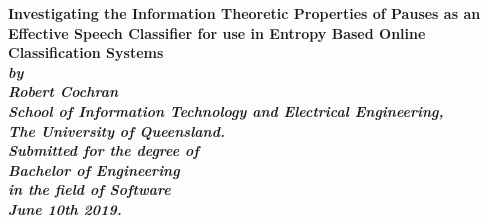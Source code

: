 \begin{titlepage}
\renewcommand{\baselinestretch}{1.0}
\begin{center}
\vspace*{35mm}
\Huge\bf
		Investigating the Information Theoretic 
		Properties of Pauses as an Effective Speech Classifier
		for use in Entropy Based Online Classification Systems \\
\vspace{20mm}
\large\sl
		by\\
		Robert Cochran
		\medskip\\
\rm
		School of Information Technology and Electrical Engineering,\\
		The University of Queensland.\\
\vspace{30mm}
		Submitted for the degree of\\
		Bachelor of Engineering
		\smallskip\\
\normalsize
		in the field of Software
		\medskip\\
\large
		June 10th 2019.		
\end{center}
\end{titlepage}

\cleardoublepage